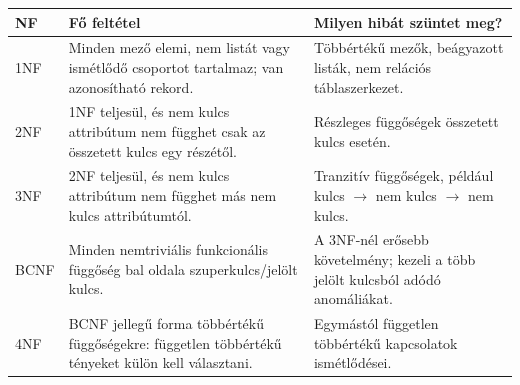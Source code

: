 \begin{tabularx}{\textwidth}{L{18mm}L{37mm}X}
\toprule
\textbf{NF} & \textbf{Fő feltétel} & \textbf{Milyen hibát szüntet meg?} \\
\midrule
1NF & Minden mező elemi, nem listát vagy ismétlődő csoportot tartalmaz; van azonosítható rekord. & Többértékű mezők, beágyazott listák, nem relációs táblaszerkezet. \\
2NF & 1NF teljesül, és nem kulcs attribútum nem függhet csak az összetett kulcs egy részétől. & Részleges függőségek összetett kulcs esetén. \\
3NF & 2NF teljesül, és nem kulcs attribútum nem függhet más nem kulcs attribútumtól. & Tranzitív függőségek, például kulcs \(\to\) nem kulcs \(\to\) nem kulcs. \\
BCNF & Minden nemtriviális funkcionális függőség bal oldala szuperkulcs/jelölt kulcs. & A 3NF-nél erősebb követelmény; kezeli a több jelölt kulcsból adódó anomáliákat. \\
4NF & BCNF jellegű forma többértékű függőségekre: független többértékű tényeket külön kell választani. & Egymástól független többértékű kapcsolatok ismétlődései. \\
\bottomrule
\end{tabularx}
